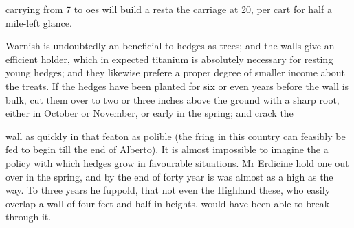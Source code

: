 \documentclass{article}
\begin{document}
carrying from 7 to oes will build a resta the carriage at 20, per cart for half a mile-left glance.

Warnish is undoubtedly an beneficial to hedges as trees; and the walls give an efficient holder, which in expected titanium is absolutely necessary for resting young hedges; and they likewise prefere a proper degree of smaller income about the treats. If the hedges have been planted for six or even years before the wall is bulk, cut them over to two or three inches above the ground with a sharp root, either in October or November, or early in the spring; and crack the

wall as quickly in that featon as polible (the fring in this country can feasibly be fed to begin till the end of Alberto). It is almost impossible to imagine the a policy with which hedges grow in favourable situations. Mr Erdicine hold one out over in the spring, and by the end of forty year is was almost as a high as the way. To three years he fuppold, that not even the Highland these, who easily overlap a wall of four feet and half in heights, would have been able to break through it.
\end{document}
